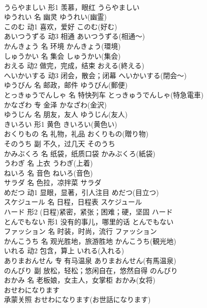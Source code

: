 \documentclass[8pt]{extreport}
\begin{document}
\begin{CJK}{UTF8}{min}
\\	うらやましい	形1	羡慕，眼红	うらやましい	
\\	ゆうれい	名	幽灵	ゆうれい(幽霊)	
\\	このむ	动1	喜欢，爱好	このむ(好む)	
\\	あいつうずる	动3	相通	あいつうずる(相通～)	
\\	かんきょう	名	环境	かんきょう(環境)	
\\	しゅうかい	名	集会	しゅうかい(集会)	
\\	おえる	动2	做完，完成，结束	おえる(終える)	
\\	へいかいする	动3	闭会，散会；闭幕	へいかいする(閉会～)	
\\	ゆうびん	名	邮政，邮件	ゆうびん(郵便)	
\\	とっきゅうでんしゃ	名	特快列车	とっきゅうでんしゃ(特急電車)	
\\	かなざわ	专	金泽	かなざわ(金沢)	
\\	ゆうじん	名	朋友，友人	ゆうじん(友人)	
\\	きいろい	形1	黄色	きいろい(黄色い)	
\\	おくりもの	名	礼物，礼品	おくりもの(贈り物)	
\\	そのうち	副	不久，过几天	そのうち	
\\	かみぶくろ	名	纸袋，纸质口袋	かみぶくろ(紙袋)	
\\	うわぎ	名	上衣	うわぎ(上着)	
\\	ねいろ	名	音色	ねいろ(音色)	
\\	サラダ	名	色拉，凉拌菜	サラダ	
\\	めだつ	动1	显眼，显著，引人注目	めだつ(目立つ)	
\\	スケジュール	名	日程，日程表	スケジュール	
\\	ハード	形2	(日程)紧密，紧张；困难；硬，坚固	ハード	
\\	とんでもない	形1	没有的事儿，哪里的话	とんでもない	
\\	ファッション	名	时装，时尚，流行	ファッション	
\\	かんこうち	名	观光胜地，旅游胜地	かんこうち(観光地)	
\\	いれる	动2	包含，算上	いれる(入れる)	
\\	ありまおんせん	专	有马温泉	ありまおんせん(有馬温泉)	
\\	のんびり	副	放松，轻松；悠闲自在，悠然自得	のんびり	
\\	おかみ	名	老板娘，女主人，女掌柜	おかみ(女将)	
\\	おせわになります	
\\	承蒙关照	おせわになります(お世話になります)	

\end{CJK}
\end{document}
